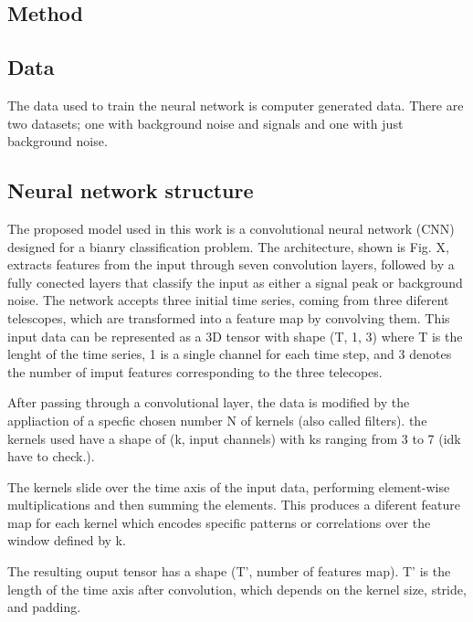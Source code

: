 \documentclass{article}
\begin{document}
\begin{multicols}{2}
\section{Method}
\subsection{Data}
The data used to train the neural network is computer generated data.
There are two datasets; one with background noise and signals and one with just background noise.


\subsection{Neural network structure}

\indent
The proposed model used in this work is a convolutional neural network (CNN) designed for a bianry classification problem.
The architecture, shown is Fig. X, extracts features from the input through seven convolution layers, 
followed by a fully conected layers that classify the input as either a signal peak or background noise.
The network accepts three initial time series, coming from three diferent telescopes, which are transformed into a feature map by convolving them.
This input data can be represented as a 3D tensor with shape (T, 1, 3) where T is the lenght of the time series,
1 is a single channel for each time step, and 3 denotes the number of imput features corresponding to the three telecopes.

After passing through a convolutional layer, the data is modified by the appliaction of a specfic chosen number N of kernels (also called filters).
the kernels used have a shape of (k, input channels) with ks ranging from 3 to 7 (idk have to check.).

The kernels slide over the time axis of the input data, performing element-wise multiplications and then summing the elements. 
This produces a diferent feature map for each kernel which encodes specific patterns or correlations over the window defined by k.

The resulting ouput tensor has a shape (T', number of features map). T' is the length of the time axis after convolution, 
which depends on the kernel size, stride, and padding.








\end{multicols}
\end{document}
